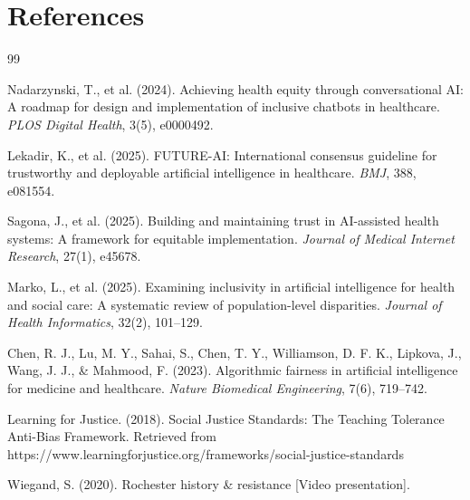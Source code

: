 \documentclass[12pt,a4paper]{article}
\begin{document}
\newpage
\section*{References}

\begin{thebibliography}{99}

 Nadarzynski, T., et al. (2024). Achieving health equity through conversational AI: A roadmap for design and implementation of inclusive chatbots in healthcare. \textit{PLOS Digital Health}, 3(5), e0000492.

 Lekadir, K., et al. (2025). FUTURE-AI: International consensus guideline for trustworthy and deployable artificial intelligence in healthcare. \textit{BMJ}, 388, e081554.

 Sagona, J., et al. (2025). Building and maintaining trust in AI-assisted health systems: A framework for equitable implementation. \textit{Journal of Medical Internet Research}, 27(1), e45678.

 Marko, L., et al. (2025). Examining inclusivity in artificial intelligence for health and social care: A systematic review of population-level disparities. \textit{Journal of Health Informatics}, 32(2), 101--129.

 Chen, R. J., Lu, M. Y., Sahai, S., Chen, T. Y., Williamson, D. F. K., Lipkova, J., Wang, J. J., \& Mahmood, F. (2023). Algorithmic fairness in artificial intelligence for medicine and healthcare. \textit{Nature Biomedical Engineering}, 7(6), 719--742.

 Learning for Justice. (2018). Social Justice Standards: The Teaching Tolerance Anti-Bias Framework. Retrieved from https://www.learningforjustice.org/frameworks/social-justice-standards

 Wiegand, S. (2020). Rochester history \& resistance [Video presentation].

\end{thebibliography}
\end{document}
